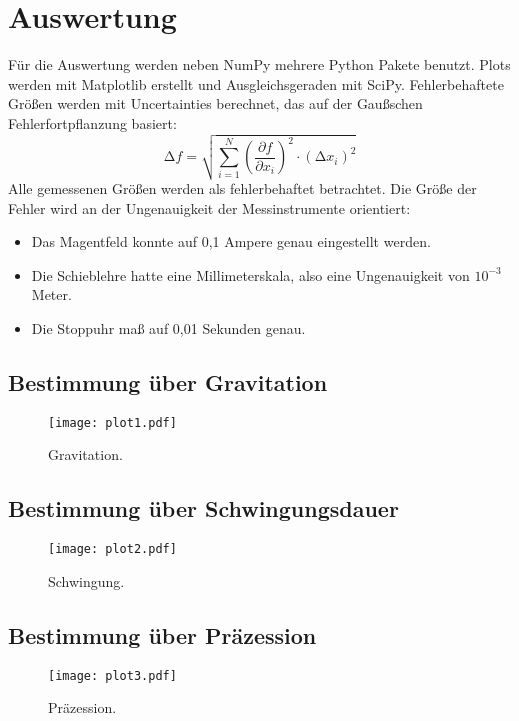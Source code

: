 \section{Auswertung}
\label{sec:Auswertung}

Für die Auswertung werden neben NumPy\cite{numpy} mehrere Python Pakete benutzt.
Plots werden mit Matplotlib\cite{matplotlib} erstellt und Ausgleichsgeraden mit SciPy\cite{scipy}.
Fehlerbehaftete Größen werden mit Uncertainties\cite{uncertainties} berechnet, das auf der Gaußschen Fehlerfortpflanzung basiert:
\begin{equation}
    \increment f = \sqrt{\sum_{i=1}^N \left( \frac{\partial f}{\partial x_i} \right)^{2} \cdot (\increment x_i)^{2}}
\end{equation}
Alle gemessenen Größen werden als fehlerbehaftet betrachtet.
Die Größe der Fehler wird an der Ungenauigkeit der Messinstrumente orientiert:
\begin{itemize}
  \item Das Magentfeld konnte auf 0,1 Ampere genau eingestellt werden.
  \item Die Schieblehre hatte eine Millimeterskala, also eine Ungenauigkeit von $10^{-3}$ Meter.
  \item Die Stoppuhr maß auf 0,01 Sekunden genau.
\end{itemize}

\subsection{Bestimmung über Gravitation}



\begin{figure}
  \centering
  \texttt{[image: plot1.pdf]}
  \caption{Gravitation.}
  \label{fig:plot1}
\end{figure}

\subsection{Bestimmung über Schwingungsdauer}

\begin{figure}
  \centering
  \texttt{[image: plot2.pdf]}
  \caption{Schwingung.}
  \label{fig:plot2}
\end{figure}

\subsection{Bestimmung über Präzession}

\begin{figure}
  \centering
  \texttt{[image: plot3.pdf]}
  \caption{Präzession.}
  \label{fig:plot3}
\end{figure}
